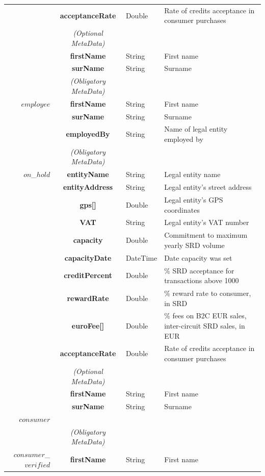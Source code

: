 \begin{table}[H]
\begin{centering}
{\begin{tabular}{ r | c | l | l }
			& {\bf acceptanceRate}		&Double	& Rate of credits acceptance in consumer purchases\\
\cline{2-2}
			 & \emph{(Optional MetaData)}& & \\
\cline{2-2}
			& {\bf firstName}			&String	& First name \\
			& {\bf surName}			&String	& Surname \\
\Xhline{1.5pt}
			& \emph{(Obligatory MetaData)} & & \\
\cline{2-2}
$employee$	& {\bf firstName}			&String	& First name \\
			& {\bf surName}			&String	& Surname \\
			& {\bf employedBy}			&String	& Name of legal entity employed by \\
\Xhline{1.5pt}
			& \emph{(Obligatory MetaData)} & & \\
\cline{2-2}
$on$\_$hold$	& {\bf entityName}			&String	& Legal entity name \\
			& {\bf entityAddress}			&String	& Legal entity's street address \\
			& {\bf gps[]}				&Double	& Legal entity's GPS coordinates \\
			& {\bf VAT}				&String	& Legal entity's VAT number \\
			& {\bf capacity}				&Double	& Commitment to maximum yearly SRD volume \\
			& {\bf capacityDate}			&DateTime & Date capacity was set \\
			& {\bf creditPercent}			&Double	& \% SRD acceptance for transactions above 1000 \\
			& {\bf rewardRate}			&Double	& \% reward rate to consumer, in SRD \\
			& {\bf euroFee[]}			&Double	& \% fees on B2C EUR sales, inter-circuit SRD sales, in EUR \\			& {\bf acceptanceRate}		&Double	& Rate of credits acceptance in consumer purchases\\
\cline{2-2}
			 & \emph{(Optional MetaData)}& & \\
\cline{2-2}
			& {\bf firstName}			&String	& First name \\
			& {\bf surName}			&String	& Surname \\
\Xhline{1.5pt}
$consumer$	& 	& &  \\
\Xhline{1.5pt}
			& \emph{(Obligatory MetaData)} & & \\
\cline{2-2}
$consumer$\_$verified$ & {\bf firstName}			&String	& First name \\

\end{tabular}}
\end{centering}
\end{table}
